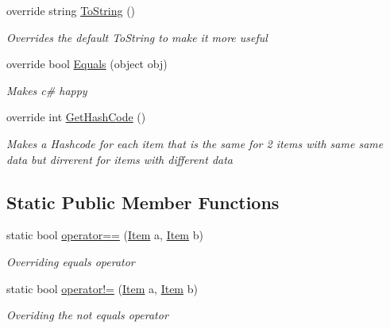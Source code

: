 \begin{DoxyCompactItemize}
override string \hyperlink{struct_bee_game_1_1_items_1_1_item_ac8039eff360bc9120180a54a0aaf13d8}{To\+String} ()
\begin{DoxyCompactList}\small\item\em Overrides the default To\+String to make it more useful \end{DoxyCompactList}\item 
override bool \hyperlink{struct_bee_game_1_1_items_1_1_item_adb0ce56e232551efc18b4e4c6e3fc1ae}{Equals} (object obj)
\begin{DoxyCompactList}\small\item\em Makes c\# happy \end{DoxyCompactList}\item 
override int \hyperlink{struct_bee_game_1_1_items_1_1_item_a6fc3c59404158c419ce0128802cbad60}{Get\+Hash\+Code} ()
\begin{DoxyCompactList}\small\item\em Makes a Hashcode for each item that is the same for 2 items with same same data but dirrerent for items with different data \end{DoxyCompactList}\end{DoxyCompactItemize}
\subsection*{Static Public Member Functions}
\begin{DoxyCompactItemize}
\item 
static bool \hyperlink{struct_bee_game_1_1_items_1_1_item_a33e02e23b17caf1ab0f6ff9c6ee3dd89}{operator==} (\hyperlink{struct_bee_game_1_1_items_1_1_item}{Item} a, \hyperlink{struct_bee_game_1_1_items_1_1_item}{Item} b)
\begin{DoxyCompactList}\small\item\em Overriding equals operator \end{DoxyCompactList}\item 
static bool \hyperlink{struct_bee_game_1_1_items_1_1_item_aedf7a9ae2db756f3351e5931dd0e2ee1}{operator!=} (\hyperlink{struct_bee_game_1_1_items_1_1_item}{Item} a, \hyperlink{struct_bee_game_1_1_items_1_1_item}{Item} b)
\begin{DoxyCompactList}\small\item\em Overiding the not equals operator \end{DoxyCompactList}\end{DoxyCompactItemize}
